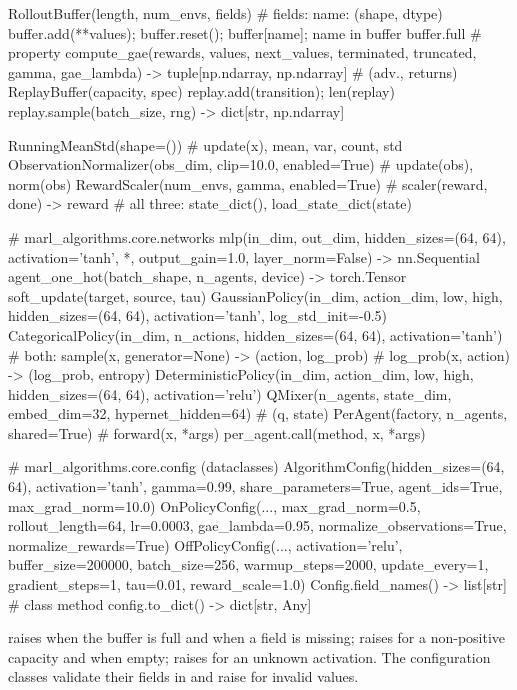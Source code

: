 \begin{pycode}
RolloutBuffer(length, num_envs, fields)     # fields: {name: (shape, dtype)}
buffer.add(**values); buffer.reset(); buffer[name]; name in buffer
buffer.full                                  # property
compute_gae(rewards, values, next_values, terminated, truncated, gamma,
            gae_lambda) -> tuple[np.ndarray, np.ndarray]   # (adv., returns)
ReplayBuffer(capacity, spec)
replay.add(transition); len(replay)
replay.sample(batch_size, rng) -> dict[str, np.ndarray]

RunningMeanStd(shape=())                     # update(x), mean, var, count, std
ObservationNormalizer(obs_dim, clip=10.0, enabled=True) # update(obs), norm(obs)
RewardScaler(num_envs, gamma, enabled=True)  # scaler(reward, done) -> reward
# all three: state_dict(), load_state_dict(state)

# marl_algorithms.core.networks
mlp(in_dim, out_dim, hidden_sizes=(64, 64), activation='tanh', *,
    output_gain=1.0, layer_norm=False) -> nn.Sequential
agent_one_hot(batch_shape, n_agents, device) -> torch.Tensor
soft_update(target, source, tau)
GaussianPolicy(in_dim, action_dim, low, high, hidden_sizes=(64, 64),
               activation='tanh', log_std_init=-0.5)
CategoricalPolicy(in_dim, n_actions, hidden_sizes=(64, 64), activation='tanh')
    # both: sample(x, generator=None) -> (action, log_prob)
    #       log_prob(x, action) -> (log_prob, entropy)
DeterministicPolicy(in_dim, action_dim, low, high, hidden_sizes=(64, 64),
                    activation='relu')
QMixer(n_agents, state_dim, embed_dim=32, hypernet_hidden=64)  # (q, state)
PerAgent(factory, n_agents, shared=True)     # forward(x, *args)
per_agent.call(method, x, *args)

# marl_algorithms.core.config (dataclasses)
AlgorithmConfig(hidden_sizes=(64, 64), activation='tanh', gamma=0.99,
                share_parameters=True, agent_ids=True, max_grad_norm=10.0)
OnPolicyConfig(..., max_grad_norm=0.5, rollout_length=64, lr=0.0003,
               gae_lambda=0.95, normalize_observations=True,
               normalize_rewards=True)
OffPolicyConfig(..., activation='relu', buffer_size=200000, batch_size=256,
                warmup_steps=2000, update_every=1, gradient_steps=1,
                tau=0.01, reward_scale=1.0)
Config.field_names() -> list[str]            # class method
config.to_dict() -> dict[str, Any]
\end{pycode}

 raises  when the buffer is full and
 when a field is missing;  raises
 for a non-positive capacity and 
 when empty;  raises  for an
unknown activation. The configuration classes validate their fields in
 and raise  for invalid values.

